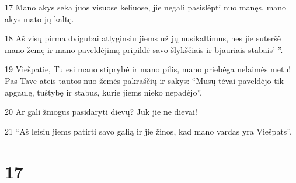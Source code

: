 \par 17 Mano akys seka juos visuose keliuose, jie negali pasislėpti nuo manęs, mano akys mato jų kaltę. 
\par 18 Aš visų pirma dvigubai atlyginsiu jiems už jų nusikaltimus, nes jie suteršė mano žemę ir mano paveldėjimą pripildė savo šlykščiais ir bjauriais stabais’ ”. 
\par 19 Viešpatie, Tu esi mano stiprybė ir mano pilis, mano priebėga nelaimės metu! Pas Tave ateis tautos nuo žemės pakraščių ir sakys: “Mūsų tėvai paveldėjo tik apgaulę, tuštybę ir stabus, kurie jiems nieko nepadėjo”. 
\par 20 Ar gali žmogus pasidaryti dievų? Juk jie ne dievai! 
\par 21 “Aš leisiu jiems patirti savo galią ir jie žinos, kad mano vardas yra Viešpats”.



\chapter{17}


